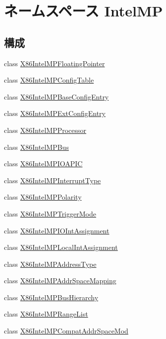 \hypertarget{namespaceIntelMP}{
\section{ネームスペース IntelMP}
\label{namespaceIntelMP}
}
\subsection*{構成}
\begin{DoxyCompactItemize}
\item 
class \hyperlink{classIntelMP_1_1X86IntelMPFloatingPointer}{X86IntelMPFloatingPointer}
\item 
class \hyperlink{classIntelMP_1_1X86IntelMPConfigTable}{X86IntelMPConfigTable}
\item 
class \hyperlink{classIntelMP_1_1X86IntelMPBaseConfigEntry}{X86IntelMPBaseConfigEntry}
\item 
class \hyperlink{classIntelMP_1_1X86IntelMPExtConfigEntry}{X86IntelMPExtConfigEntry}
\item 
class \hyperlink{classIntelMP_1_1X86IntelMPProcessor}{X86IntelMPProcessor}
\item 
class \hyperlink{classIntelMP_1_1X86IntelMPBus}{X86IntelMPBus}
\item 
class \hyperlink{classIntelMP_1_1X86IntelMPIOAPIC}{X86IntelMPIOAPIC}
\item 
class \hyperlink{classIntelMP_1_1X86IntelMPInterruptType}{X86IntelMPInterruptType}
\item 
class \hyperlink{classIntelMP_1_1X86IntelMPPolarity}{X86IntelMPPolarity}
\item 
class \hyperlink{classIntelMP_1_1X86IntelMPTriggerMode}{X86IntelMPTriggerMode}
\item 
class \hyperlink{classIntelMP_1_1X86IntelMPIOIntAssignment}{X86IntelMPIOIntAssignment}
\item 
class \hyperlink{classIntelMP_1_1X86IntelMPLocalIntAssignment}{X86IntelMPLocalIntAssignment}
\item 
class \hyperlink{classIntelMP_1_1X86IntelMPAddressType}{X86IntelMPAddressType}
\item 
class \hyperlink{classIntelMP_1_1X86IntelMPAddrSpaceMapping}{X86IntelMPAddrSpaceMapping}
\item 
class \hyperlink{classIntelMP_1_1X86IntelMPBusHierarchy}{X86IntelMPBusHierarchy}
\item 
class \hyperlink{classIntelMP_1_1X86IntelMPRangeList}{X86IntelMPRangeList}
\item 
class \hyperlink{classIntelMP_1_1X86IntelMPCompatAddrSpaceMod}{X86IntelMPCompatAddrSpaceMod}
\end{DoxyCompactItemize}
